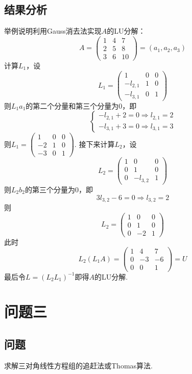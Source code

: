 \documentclass[UTF8,ctexart,a4paper,11pt,openany]{article}
\theoremstyle{definition}
\begin{document}
    \subsection{结果分析}
    举例说明利用Gauss消去法实现$A$的LU分解：$$A=\left(\begin{array}{ccc}1 & 4 & 7 \\ 2 & 5 & 8 \\ 3 & 6 & 10\end{array}\right)=\left(a_{1}, a_{2}, a_{3}\right)$$计算$L_1$，设$$L_{1}=\left(\begin{array}{ccc}1 & 0 & 0 \\ -l_{2,1} & 1 & 0 \\ -l_{3,1} & 0 & 1\end{array}\right)$$则$L_1a_1$的第二个分量和第三个分量为0，即$$\left\{\begin{array}{l}-l_{2,1}+2=0 \Rightarrow l_{2,1}=2 \\ -l_{3,1}+3=0 \Rightarrow l_{3,1}=3\end{array}\right.$$则$L_{1}=\left(\begin{array}{ccc}1 & 0 & 0 \\ -2 & 1 & 0 \\ -3 & 0 & 1\end{array}\right)$. 接下来计算$L_2$，设$$L_{2}=\left(\begin{array}{ccc}1 & 0 & 0 \\ 0 & 1 & 0 \\ 0 & -l_{3,2} & 1\end{array}\right)$$则$L_2b_2$的第三个分量为0，即$$3l_{3,2}-6=0 \Rightarrow l_{3,2}=2$$则$$L_{2}=\left(\begin{array}{ccc}1 & 0 & 0 \\ 0 & 1 & 0 \\ 0 & -2 & 1\end{array}\right)$$此时$$L_{2}\left(L_{1} A\right)=\left(\begin{array}{ccc}1 & 4 & 7 \\ 0 & -3 & -6 \\ 0 & 0 & 1\end{array}\right)=U$$最后令$L=(L_2L_1)^{-1}$即得$A$的LU分解.

\section{问题三}
    \subsection{问题}
    求解三对角线性方程组的追赶法或Thomas算法.
\end{document}
